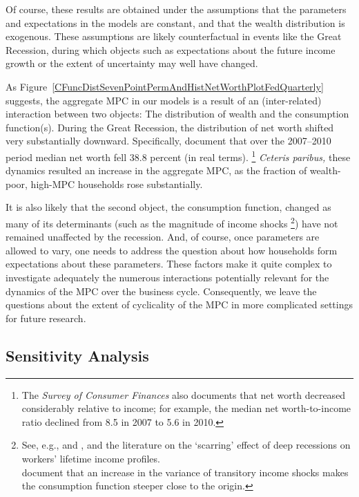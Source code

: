 \documentclass[12pt,titlepage]{econtex}
\begin{document}
Of course, these results are obtained under the assumptions that the parameters and expectations in the models are constant, and that the wealth distribution is exogenous.   These assumptions are likely counterfactual in events like the Great Recession, during which objects such as expectations about the future income growth or the extent of uncertainty may well have changed.

As Figure~\ref{CFuncDistSevenPointPermAndHistNetWorthPlotFedQuarterly} suggests, the aggregate MPC in our models is a result of an (inter-related) interaction between two objects:  The  distribution of wealth and the consumption function(s). During the Great Recession, the distribution of net worth shifted very substantially downward.  Specifically, \cite{brickerEtAl:SCF2010} document that over the 2007--2010 period median net worth fell 38.8 percent (in real terms).%
\footnote{%
The \emph{Survey of Consumer Finances} also documents that net worth decreased considerably relative to income; for example, the median net worth-to-income ratio declined from 8.5 in 2007 to 5.6 in 2010.
}
\emph{Ceteris paribus,} these dynamics resulted an increase in the aggregate MPC, as the fraction of wealth-poor, high-MPC households rose substantially.

It is also likely that the second object, the consumption function, changed as many of its determinants (such as the magnitude of income shocks%
\footnote{%
See, e.g., \cite{gosCyclical} and \cite{Blundell:2013tm}, and the literature on the `scarring' effect of deep recessions on workers' lifetime income profiles.\\
\cite{cstMPCxc} document that an increase in the variance of transitory income shocks makes the consumption function steeper close to the origin.
}) have not remained unaffected by the recession. And, of course, once parameters are allowed to vary, one needs to address the question about how households form expectations about these parameters. These factors make it quite complex to investigate adequately the numerous interactions potentially relevant for the dynamics of the MPC over the business cycle. Consequently, we leave the questions about the extent of cyclicality of the MPC in more complicated settings for future research.


\subsection{Sensitivity Analysis}\label{sec:Sensitivity}
\end{document}
